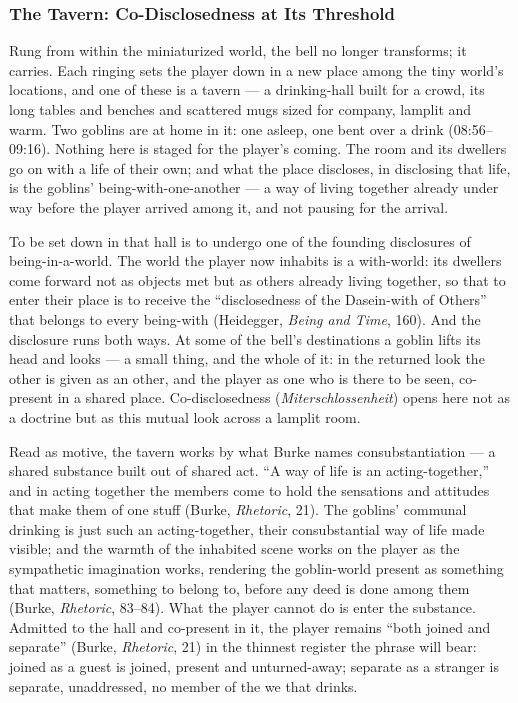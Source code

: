 \documentclass{article}
\begin{document}
\subsubsection*{The Tavern: Co-Disclosedness at Its Threshold}

Rung from within the miniaturized world, the bell no longer transforms; it carries. Each ringing sets the player down in a new place among the tiny world's locations, and one of these is a tavern — a drinking-hall built for a crowd, its long tables and benches and scattered mugs sized for company, lamplit and warm. Two goblins are at home in it: one asleep, one bent over a drink (08:56–09:16). Nothing here is staged for the player's coming. The room and its dwellers go on with a life of their own; and what the place discloses, in disclosing that life, is the goblins' being-with-one-another — a way of living together already under way before the player arrived among it, and not pausing for the arrival.

To be set down in that hall is to undergo one of the founding disclosures of being-in-a-world. The world the player now inhabits is a with-world: its dwellers come forward not as objects met but as others already living together, so that to enter their place is to receive the ``disclosedness of the Dasein-with of Others'' that belongs to every being-with (Heidegger, \textit{Being and Time}, 160). And the disclosure runs both ways. At some of the bell's destinations a goblin lifts its head and looks — a small thing, and the whole of it: in the returned look the other is given as an other, and the player as one who is there to be seen, co-present in a shared place. Co-disclosedness (\textit{Miterschlossenheit}) opens here not as a doctrine but as this mutual look across a lamplit room.

Read as motive, the tavern works by what Burke names consubstantiation — a shared substance built out of shared act. ``A way of life is an acting-together,'' and in acting together the members come to hold the sensations and attitudes that make them of one stuff (Burke, \textit{Rhetoric}, 21). The goblins' communal drinking is just such an acting-together, their consubstantial way of life made visible; and the warmth of the inhabited scene works on the player as the sympathetic imagination works, rendering the goblin-world present as something that matters, something to belong to, before any deed is done among them (Burke, \textit{Rhetoric}, 83–84). What the player cannot do is enter the substance. Admitted to the hall and co-present in it, the player remains ``both joined and separate'' (Burke, \textit{Rhetoric}, 21) in the thinnest register the phrase will bear: joined as a guest is joined, present and unturned-away; separate as a stranger is separate, unaddressed, no member of the we that drinks.
\end{document}
